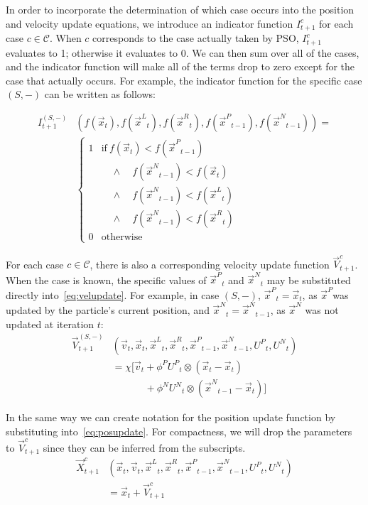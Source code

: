 \documentclass[journal,letterpaper]{IEEEtran}
\providecommand{\pers}{\ensuremath{P}}
\providecommand{\neigh}{\ensuremath{N}}
\providecommand{\leftind}{\ensuremath{L}}
\providecommand{\rightind}{\ensuremath{R}}
\providecommand{\nURand}{\ensuremath{U^\neigh}}
\providecommand{\pURand}{\ensuremath{U^\pers}}
\providecommand{\ppos}{\ensuremath{\Vec{x}}}
\providecommand{\pvel}{\ensuremath{\Vec{v}}}
\providecommand{\nbest}{\ensuremath{\Vec{x}^\neigh}}
\providecommand{\pbest}{\ensuremath{\Vec{x}^\pers}}
\providecommand{\constriction}{\ensuremath{\chi}}
\providecommand{\ncoeff}{\ensuremath{\phi^\neigh}}
\providecommand{\pcoeff}{\ensuremath{\phi^\pers}}
\providecommand{\ofunc}{\ensuremath{f}}
\providecommand{\indic}{\ensuremath{I}}
\providecommand{\specvel}{\ensuremath{\vec{V}}}
\providecommand{\specpos}{\ensuremath{\vec{X}}}
\providecommand{\leftn}{\ensuremath{\Vec{x}^\leftind}}
\providecommand{\rightn}{\ensuremath{\Vec{x}^\rightind}}
\providecommand{\caseset}{\ensuremath{\mathcal{C}}}
\providecommand{\casegen}{\ensuremath{c}}
\providecommand{\casexn}{\ensuremath{(S,-)}}
\begin{document}
In order to incorporate the determination of which case occurs into the
position and velocity update equations, we introduce an indicator function
$\indic_{t+1}^{\casegen}$ for each case $\casegen \in \caseset$.  When
$\casegen$ corresponds to the case actually taken by PSO,
$\indic_{t+1}^{\casegen}$ evaluates to 1; otherwise it evaluates to 0.  We can
then sum over all of the cases, and the indicator function will make all of the
terms drop to zero except for the case that actually occurs.  For example, the
indicator function for the specific case $\casexn$ can be written as follows:

\begin{align}
  \nonumber
	\indic_{t+1}^{\casexn} & (\ofunc ( \ppos_{t} ) ,\ofunc(\leftn_{t}),
	\ofunc(\rightn_{t}) ,\ofunc(\pbest_{t-1}) ,\ofunc(\nbest_{t-1}))= \\
  \label{eq:deficasexn}
	&\begin{cases}
	   1 & \text{if} \ \ofunc(\ppos_{t}) < \ofunc(\pbest_{t-1}) \\
	   &\quad \wedge \quad \ofunc(\nbest_{t-1}) < \ofunc(\ppos_{t}) \\
	   &\quad \wedge \quad \ofunc(\nbest_{t-1}) < \ofunc(\leftn_{t}) \\
	   &\quad \wedge \quad \ofunc(\nbest_{t-1}) < \ofunc(\rightn_{t}) \\
	   0 & \text{otherwise}
	\end{cases}
\end{align}

For each case $\casegen \in \caseset$, there is also a corresponding
velocity update function $\specvel_{t+1}^{\casegen}$.  When the case is
known, the specific values of $\pbest_t$ and $\nbest_t$ may be substituted
directly into~\eqref{eq:velupdate}.  For example, in case $\casexn$,
$\pbest_{t}=\ppos_{t}$, as \pbest was updated by the particle's current
position, and $\nbest_{t}=\nbest_{t-1}$, as $\nbest$ was not updated at
iteration $t$:
\begin{align}
\nonumber
	\specvel_{t+1}^{\casexn} & (\pvel_t, \ppos_{t}, \leftn_{t}, \rightn_{t},
	\pbest_{t-1}, \nbest_{t-1}, \pURand_{t}, \nURand_{t}) \\
\nonumber
		&= \constriction \bigl[ \pvel_{t} +
			\pcoeff\pURand_{t}\otimes(\ppos_{t} - \ppos_{t}) \\
\label{eq:defvcasexn}
			& \quad \quad \quad \; + \ncoeff\nURand_{t}\otimes(\nbest_{t-1} -
			\ppos_{t}) \bigr]
\end{align}

In the same way we can create notation for the position update function by
substituting into~\eqref{eq:posupdate}.  For compactness, we will drop the
parameters to $\specvel_{t+1}^{\casegen}$ since they can be inferred from the
subscripts.
\begin{align}
\label{eq:defpcasegen}
	\specpos_{t+1}^{\casegen} & (\ppos_{t}, \pvel_{t}, \leftn_{t},
	\rightn_{t} ,\pbest_{t-1} ,\nbest_{t-1}, \pURand_{t}, \nURand_{t}) \\
\nonumber
	& = \ppos_{t} + \specvel_{t+1}^{\casegen}
\end{align}
\end{document}
